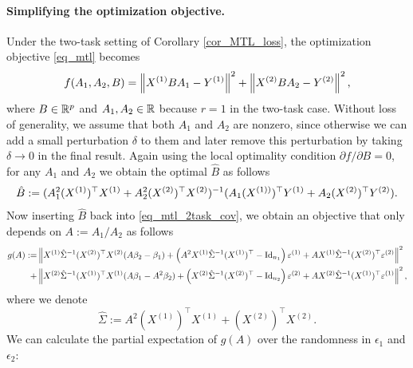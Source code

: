 \paragraph{Simplifying the optimization objective.} 
Under the two-task setting of Corollary \ref{cor_MTL_loss}, the optimization objective \eqref{eq_mtl} becomes
	\begin{align}
		f(A_1,A_2, B) =   \left\| X^{(1)} B A_1 - Y^{(1)} \right\|^2+ \left\| X^{(2)} B A_2 - Y^{(2)} \right\|^2, \label{eq_mtl_2task_cov}
	\end{align}
	where $B \in \mathbb{R}^{p}$ and $A_1, A_2\in \mathbb{R}$ because $r=1$ in the two-task case. %
	Without loss of generality, we assume that both $A_1$ and $A_2$ are nonzero, since otherwise we can add a small perturbation $\delta$ to them and later remove this perturbation by taking $\delta\to 0$ in the final result. Again using the local optimality condition ${\partial f}/{\partial B} = 0$, for any $A_1$ and $A_2$ we obtain the optimal $\hat{B}$ as follows
	\begin{align}
		\hat{B} \define  (A_1^2 (X^{(1)})^{\top}X^{(1)} + A_2^2 (X^{(2)})^{\top}X^{(2)})^{-1} (A_1 (X^{(1))})^{\top}Y^{(1)} + A_2 (X^{(2)})^{\top}Y^{(2)}). \label{eq_Bhat_2task} %
	\end{align}
 Now inserting $\hat B$ back into \eqref{eq_mtl_2task_cov}, we obtain an objective that only depends on $A:=A_1/A_2$ as follows 
 \begin{align}
		 g(A) := & \left\| X^{(1)} \hat \Sigma^{-1} (X^{(2)})^\top X^{(2)} (A\beta_2-\beta_1)+ \left(A^2 X^{(1)}\hat \Sigma^{-1} (X^{(1)})^\top-\operatorname{Id}_{n_1}\right)\varepsilon^{(1)} + A X^{(1)}\hat \Sigma^{-1} (X^{(2)})^\top \varepsilon^{(2)} \right\|^2 \nonumber\\
		 + & \left\| X^{(2)} \hat \Sigma^{-1} (X^{(1)})^\top X^{(1)} (A\beta_1-A^2\beta_2)+ \left(X^{(2)}\hat \Sigma^{-1} (X^{(2)})^\top-\operatorname{Id}_{n_2}\right)\varepsilon^{(2)} + A X^{(2)}\hat \Sigma^{-1} (X^{(1)})^\top \varepsilon^{(1)} \right\|^2, 
		\label{eq_mtl_A12}
	\end{align}
	where we denote
	$$\hat \Sigma:= A^2 (X^{(1)})^\top X^{(1)}  + (X^{(2)})^\top X^{(2)} .$$
We can calculate the partial expectation of $g(A)$ over the randomness in $\epsilon_1$ and $\epsilon_2$:
